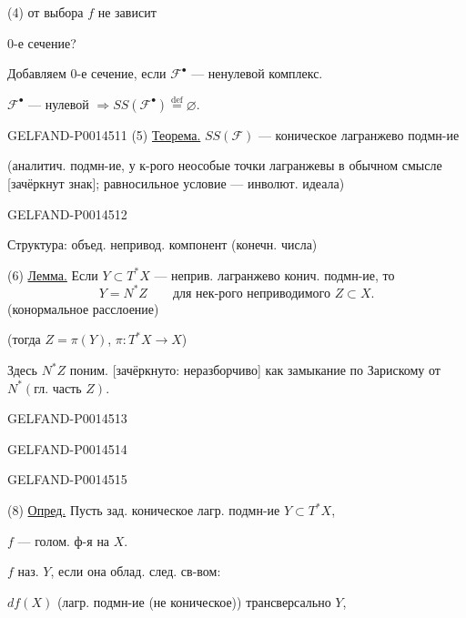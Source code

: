 (4) от выбора \(f\) не зависит

0-е сечение?

Добавляем 0-е сечение, если \(\mathcal F^{\bullet}\) — ненулевой комплекс.

\(\mathcal F^{\bullet}\) — нулевой
\(\Rightarrow SS(\mathcal F^{\bullet})\overset{\mathrm{def}}{=}\varnothing\).


\begin{GelfandAdjacentEvidence}{GELFAND-P001451}{1}
(5) \uline{Теорема.}
\(SS(\mathcal{F})\) — коническое лагранжево подмн-ие

(аналитич. подмн-ие, у к-рого неособые точки лагранжевы в обычном смысле [зачёркнут знак]; равносильное условие — инволют. идеала)
\end{GelfandAdjacentEvidence}
\begin{GelfandAdjacentEvidence}{GELFAND-P001451}{2}


Структура: объед. непривод. компонент (конечн. числа)

(6) \uline{Лемма.}
Если \(Y\subset T^{*}X\) — неприв. лагранжево конич. подмн-ие, то
\begin{equation*}
Y=N^{*}Z\qquad
\text{для нек-рого неприводимого } Z\subset X. \tag{7}
\end{equation*}
(конормальное расслоение)

(тогда \(Z=\pi(Y)\), \(\pi\colon T^{*}X\longrightarrow X\))

Здесь \(N^{*}Z\) поним. [зачёркнуто: неразборчиво]
как замыкание по Зарискому от \(N^{*}(\text{гл. часть }Z)\).
\end{GelfandAdjacentEvidence}
\begin{GelfandAdjacentEvidence}{GELFAND-P001451}{3}

\end{GelfandAdjacentEvidence}
\begin{GelfandAdjacentEvidence}{GELFAND-P001451}{4}


\end{GelfandAdjacentEvidence}
\begin{GelfandAdjacentEvidence}{GELFAND-P001451}{5}

(8) \uline{Опред.}
Пусть зад. коническое лагр. подмн-ие \(Y\subset T^{*}X\),

\(f\) — голом. ф-я на \(X\).

\(f\) наз.  \(Y\), если она облад. след. св-вом:

\(df(X)\) (лагр. подмн-ие (не коническое)) трансверсально \(Y\),
\end{GelfandAdjacentEvidence}
